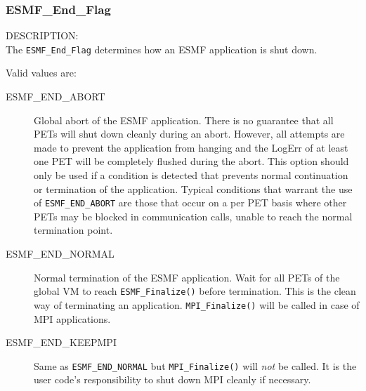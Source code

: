 
\subsubsection{ESMF\_End\_Flag}
\label{app:endflag}

{\sf DESCRIPTION:\\}
The {\tt ESMF\_End\_Flag} determines how an ESMF application is shut down.

Valid values are:
\begin{description}
   \item [ESMF\_END\_ABORT] 
         Global abort of the ESMF application. There is no guarantee 
         that all PETs will shut down cleanly during an abort. However, all
         attempts are made to prevent the application from hanging and the
         LogErr of at least one PET will be completely flushed during the abort.
         This option should only be used if a condition is detected that
         prevents normal continuation or termination of the application.
         Typical conditions that warrant the use of {\tt ESMF\_END\_ABORT} are those
         that occur on a per PET basis where other PETs may be blocked in 
         communication calls, unable to reach the normal termination point.
   \item [ESMF\_END\_NORMAL]
         \begin{sloppypar}
         Normal termination of the ESMF application. Wait for all PETs of the
         global VM to reach 
	{\tt ESMF\_Finalize()} before termination. This is
         the clean way of terminating an application. {\tt MPI\_Finalize()} will
         be called in case of MPI applications.
         \end{sloppypar}
   \item [ESMF\_END\_KEEPMPI]
         Same as {\tt ESMF\_END\_NORMAL} but {\tt MPI\_Finalize()} will {\em not}
         be called. It is the user code's responsibility to shut down MPI
         cleanly if necessary.
\end{description}
